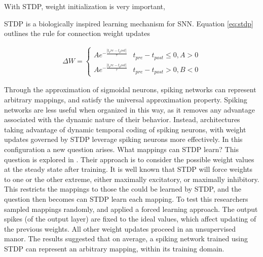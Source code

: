     
    With STDP, weight initialization is very important, 
    
    STDP is a biologically inspired learning mechanism for SNN. Equation
    \ref{eq:stdp} outlines the rule for connection weight updates
    
    \begin{align}
        \Delta W =
        \begin{cases} 
          Ae^{-\frac{|t_pre-t_post|}{\tau}} & t_{pre} - t_{post} \leq 0, A > 0
          \\ Ae^{-\frac{|t_pre-t_post|}{\tau}} & t_{pre} - t_{post} > 0, B < 0
       \end{cases} \label{eq:stdp}
    \end{align}
    
    Through the approximation of sigmoidal neurons, spiking networks can
    represent arbitrary mappings, and satisfy the universal approximation
    property. Spiking networks are less useful when organized in this way, as it
    removes any advantage associated with the dynamic nature of their
    behavior. Instead, architectures taking advantage of dynamic temporal coding
    of spiking neurons, with weight updates governed by STDP leverage spiking
    neurons more effectively. In this configuration a new question arises. What
    mappings can STDP learn? This question is explored in
    \cite{legenstein_2005}. Their approach is to consider the possible weight
    values at the steady state after training. It is well known that STDP will
    force weights to one or the other extreme, either maximally excitatory, or
    maximally inhibitory. This restricts the mappings to those the could be
    learned by STDP, and the question then becomes can STDP learn each
    mapping. To test this researchers sampled mappings randomly, and applied a
    forced learning approach. The output spikes (of the output layer) are fixed
    to the ideal values, which affect updating of the previous weights. All
    other weight updates proceed in an unsupervised manor. The results suggested
    that on average, a spiking network trained using STDP can represent an
    arbitrary mapping, within its training domain.
    

